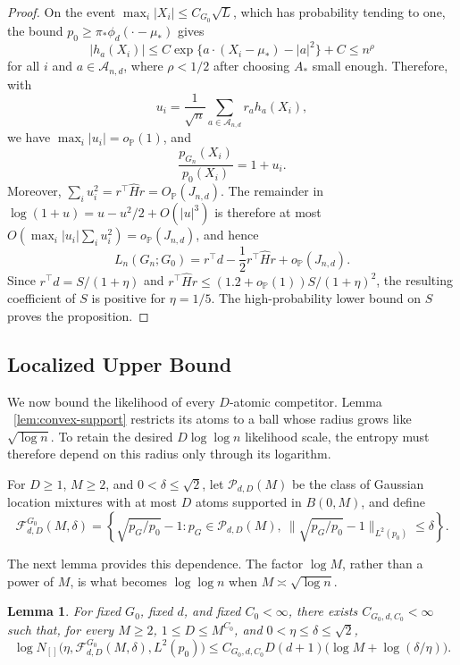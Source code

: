 \documentclass[11pt]{article}
\newtheorem{lemma}[theorem]{Lemma}
\theoremstyle{definition}
\numberwithin{equation}{section}
\newcommand{\wh}{\widehat}
\begin{document}
\begin{proof}
On the event \(\max_i|X_i|\le C_{G_0}\sqrt L\), which has probability tending to one, the bound \(p_0\ge\pi_*\phi_d(\cdot-\mu_*)\) gives
\[
    |h_a(X_i)|
    \le
    C\exp\{a\cdot(X_i-\mu_*)-|a|^2\}+C
    \le n^\rho
\]
for all \(i\) and \(a\in\mathcal A_{n,d}\), where \(\rho<1/2\) after choosing \(A_*\) small enough. Therefore, with
\[
    u_i=\frac1{\sqrt n}\sum_{a\in\mathcal A_{n,d}}r_a h_a(X_i),
\]
we have \(\max_i|u_i|=o_{\mathbb P}(1)\), and
\[
    \frac{p_{G_n}(X_i)}{p_0(X_i)}=1+u_i.
\]
Moreover, \(\sum_i u_i^2=r^\top\wh H r=O_{\mathbb P}(J_{n,d})\).
The remainder in \(\log(1+u)=u-u^2/2+O(|u|^3)\) is therefore at most
\(O(\max_i|u_i|\sum_i u_i^2)=o_{\mathbb P}(J_{n,d})\), and hence
\[
    L_n(G_n;G_0)
    =
    r^\top d-\frac12 r^\top\wh H r+o_{\mathbb P}(J_{n,d}).
\]
Since \(r^\top d=S/(1+\eta)\) and
\(r^\top\wh H r\le(1.2+o_{\mathbb P}(1))S/(1+\eta)^2\), the resulting
coefficient of \(S\) is positive for \(\eta=1/5\). The high-probability
lower bound on \(S\) proves the proposition.
\end{proof}

\subsection{Localized Upper Bound}
\label{sec:gaussian-localized-upper}

We now bound the likelihood of every \(D\)-atomic competitor. Lemma
~\ref{lem:convex-support} restricts its atoms to a ball whose radius grows
like \(\sqrt{\log n}\). To retain the desired \(D\log\log n\) likelihood
scale, the entropy must therefore depend on this radius only through its
logarithm.

For \(D\ge1\), \(M\ge2\), and \(0<\delta\le\sqrt2\), let \(\mathcal P_{d,D}(M)\) be the class of Gaussian location mixtures with at most \(D\) atoms supported in \(B(0,M)\), and define
\[
    \mathcal F_{d,D}^{G_0}(M,\delta)
    =
    \left\{
        \sqrt{p_G/p_0}-1:
        p_G\in\mathcal P_{d,D}(M),
        \ \|\sqrt{p_G/p_0}-1\|_{L^2(p_0)}\le\delta
    \right\}.
\]

The next lemma provides this dependence. The factor \(\log M\), rather than
a power of \(M\), is what becomes \(\log\log n\) when
\(M\asymp\sqrt{\log n}\).

\begin{lemma}
\label{lem:gaussian-finite-local-bracket}
For fixed \(G_0\), fixed \(d\), and fixed \(C_0<\infty\), there exists
\(C_{G_0,d,C_0}<\infty\) such that, for every \(M\ge2\),
\(1\le D\le M^{C_0}\), and \(0<\eta\le\delta\le\sqrt2\),
\[
    \log N_{[]}
    \bigl(
        \eta,
        \mathcal F_{d,D}^{G_0}(M,\delta),
        L^2(p_0)
    \bigr)
    \le
    C_{G_0,d,C_0}D(d+1)\bigl(\log M+\log(\delta/\eta)\bigr).
\]
\end{lemma}
\end{document}
